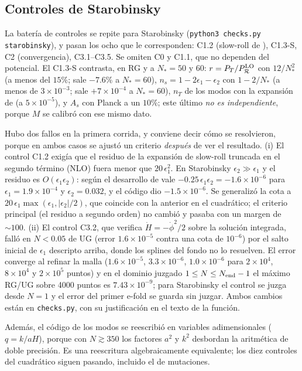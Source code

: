 \subsection{Controles de Starobinsky}
\label{sec:controlesstaro}

La batería de controles se repite para Starobinsky (\texttt{python3 checks.py starobinsky}), y pasan los ocho que le corresponden: C1.2 (slow-roll de \cite{martin14}), C1.3-S, C2 (convergencia), C3.1--C3.5. Se omiten C0 y C1.1, que no dependen del potencial. El C1.3-S contrasta, en RG y a $N_*=50$ y $60$: $r=P_T/P_\mathcal{R}^{\rm LO}$ con $12/N_*^2$ (a menos del $15\%$; sale $-7.6\%$ a $N_*=60$), $n_s=1-2\epsilon_1-\epsilon_2$ con $1-2/N_*$ (a menos de $3\times10^{-3}$; sale $+7\times10^{-4}$ a $N_*=60$), $n_T$ de los modos con la expansión de \cite{martin14} (a $5\times10^{-5}$), y $A_s$ con Planck a un $10\%$; este último \emph{no es independiente}, porque $M$ se calibró con ese mismo dato.

Hubo dos fallos en la primera corrida, y conviene decir cómo se resolvieron, porque en ambos casos se ajustó un criterio \emph{después} de ver el resultado. (i) El control C1.2 exigía que el residuo de la expansión de slow-roll truncada en el segundo término (NLO) fuera menor que $20\,\epsilon_1^2$. En Starobinsky $\epsilon_2\gg\epsilon_1$ y el residuo es $O(\epsilon_1\epsilon_2)$: según el desarrollo de \cite{martin14} vale $-0.25\,\epsilon_1\epsilon_2=-1.6\times10^{-6}$ para $\epsilon_1=1.9\times10^{-4}$ y $\epsilon_2=0.032$, y el código dio $-1.5\times10^{-6}$. Se generalizó la cota a $20\,\epsilon_1\max(\epsilon_1,|\epsilon_2|/2)$, que coincide con la anterior en el cuadrático; el criterio principal (el residuo a segundo orden) no cambió y pasaba con un margen de $\sim100$. (ii) El control C3.2, que verifica $\dot H=-\dot\phi^2/2$ sobre la solución integrada, falló en $N<0.05$ de UG (error $1.6\times10^{-5}$ contra una cota de $10^{-6}$) por el salto inicial de $\epsilon_1$ descripto arriba, donde los splines del fondo no lo resuelven. El error converge al refinar la malla ($1.6\times10^{-5}$, $3.3\times10^{-6}$, $1.0\times10^{-6}$ para $2\times10^4$, $8\times10^4$ y $2\times10^5$ puntos) y en el dominio juzgado $1\le N\le N_{\rm end}-1$ el máximo RG/UG sobre 4000 puntos es $7.43\times10^{-9}$; para Starobinsky el control se juzga desde $N=1$ y el error del primer e-fold se guarda sin juzgar. Ambos cambios están en \texttt{checks.py}, con su justificación en el texto de la función.

Además, el código de los modos se reescribió en variables adimensionales ($q=k/aH$), porque con $N\gtrsim350$ los factores $a^2$ y $k^2$ desbordan la aritmética de doble precisión. Es una reescritura algebraicamente equivalente; los diez controles del cuadrático siguen pasando, incluido el de mutaciones.

